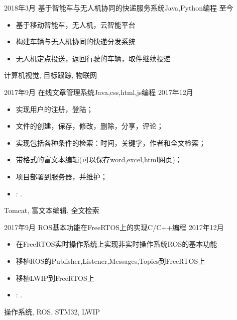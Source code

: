 %
%


 
\begin{experiences}
			
  \experience
    {2018年3月}   {基于智能车与无人机协同的快递服务系统}{Java,Python编程}{}
    {至今} {
          \begin{itemize}
          \item 基于移动智能车，无人机，云智能平台
          \item 构建车辆与无人机协同的快递分发系统
          \item 无人机定点投送，返回行驶的车辆，取件继续投递                                                                                  
          \end{itemize}
    }
    {计算机视觉, 目标跟踪, 物联网}
  \emptySeparator
             

  \experience
  {2017年9月}   {在线文章管理系统}{Java,css,html,js编程}{}
  {2017年12月} {
      \begin{itemize}
      \item 实现用户的注册，登陆；
      \item 文件的创建，保存，修改，删除，分享，评论；
      \item 实现包括各种条件的检索：时间，关键字，作者和全文检索；
      \item 带格式的富文本编辑(可以保存word,excel,html网页)；
      \item 项目部署到服务器，并维护；
      \item \faGithub: 
      .                                                                                       
      \end{itemize}
  }
  {Tomcat, 富文本编辑, 全文检索}
  \emptySeparator

  \experience
  {2017年9月}   {ROS基本功能在FreeRTOS上的实现}{C/C++编程}{}
  {2017年12月} {
        \begin{itemize}
        \item 在FreeRTOS实时操作系统上实现非实时操作系统ROS的基本功能
        \item 移植ROS的Publisher,Listener,Messages,Topics到FreeRTOS上
        \item 移植LWIP到FreeRTOS上
        \item \faGithub: 
        .                                                                                       
        \end{itemize}
  }
  {操作系统, ROS, STM32, LWIP}
  \emptySeparator



\end{experiences}
